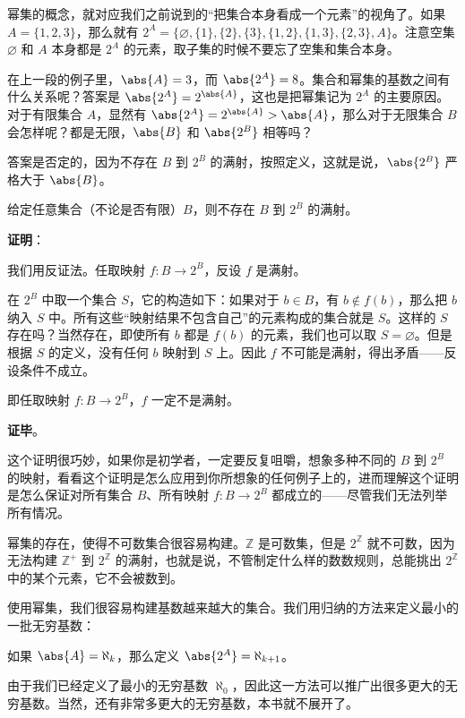 幂集的概念，就对应我们之前说到的“把集合本身看成一个元素”的视角了。如果 $A=\{1,2,3\}$，那么就有 $2^A=\{\varnothing, \{1\}, \{2\}, \{3\}, \{1,2\}, \{1,3\}, \{2,3\}, A\}$。注意空集 $\varnothing$ 和 $A$ 本身都是 $2^A$ 的元素，取子集的时候不要忘了空集和集合本身。

在上一段的例子里，$\abs{A}=3$，而 $\abs{2^A}=8$。集合和幂集的基数之间有什么关系呢？答案是 $\abs{2^A}=2^{\abs{A}}$，这也是把幂集记为 $2^A$ 的主要原因。对于有限集合 $A$，显然有 $\abs{2^A}=2^{\abs{A}}>\abs{A}$，那么对于无限集合 $B$ 会怎样呢？都是无限，$\abs{B}$ 和 $\abs{2^B}$ 相等吗？

答案是否定的，因为不存在 $B$ 到 $2^B$ 的满射，按照定义，这就是说，$\abs{2^B}$ 严格大于 $\abs{B}$。

\begin{theorem}{}
给定任意集合（不论是否有限）$B$，则不存在 $B$ 到 $2^B$ 的满射。
\end{theorem}

\textbf{证明}：

我们用反证法。任取映射 $f:B\rightarrow 2^B$，反设 $f$ 是满射。

在 $2^B$ 中取一个集合 $S$，它的构造如下：如果对于 $b\in B$，有 $b\not\in f(b)$，那么把 $b$ 纳入 $S$ 中。所有这些“映射结果不包含自己”的元素构成的集合就是 $S$。这样的 $S$ 存在吗？当然存在，即使所有 $b$ 都是 $f(b)$ 的元素，我们也可以取 $S=\varnothing$。但是根据 $S$ 的定义，没有任何 $b$ 映射到 $S$ 上。因此 $f$ 不可能是满射，得出矛盾——反设条件不成立。

即任取映射 $f:B\rightarrow 2^B$，$f$ 一定不是满射。

\textbf{证毕}。

这个证明很巧妙，如果你是初学者，一定要反复咀嚼，想象多种不同的 $B$ 到 $2^B$ 的映射，看看这个证明是怎么应用到你所想象的任何例子上的，进而理解这个证明是怎么保证对所有集合 $B$、所有映射 $f:B\rightarrow 2^B$ 都成立的——尽管我们无法列举所有情况。

幂集的存在，使得不可数集合很容易构建。$\mathbb{Z}$ 是可数集，但是 $2^{\mathbb{Z}}$ 就不可数，因为无法构建 $\mathbb{Z}^+$ 到 $2^{\mathbb{Z}}$ 的满射，也就是说，不管制定什么样的数数规则，总能挑出 $2^{\mathbb{Z}}$ 中的某个元素，它不会被数到。

使用幂集，我们很容易构建基数越来越大的集合。我们用归纳的方法来定义最小的一批无穷基数：
\begin{definition}{}
如果 $\abs{A}=\aleph_k$，那么定义 $\abs{2^A}=\aleph_{k+1}$。
\end{definition}
由于我们已经定义了最小的无穷基数 $\aleph_0$，因此这一方法可以推广出很多更大的无穷基数。当然，还有非常多更大的无穷基数，本书就不展开了。

